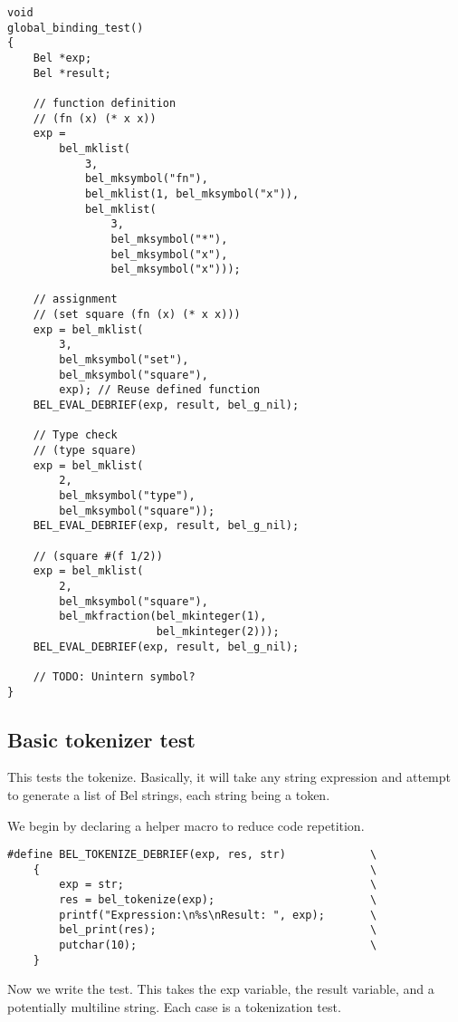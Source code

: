 \documentclass[openright,a4paper,twoside,12pt]{memoir}
\begin{document}
\begin{verbatim}
void
global_binding_test()
{
    Bel *exp;
    Bel *result;

    // function definition
    // (fn (x) (* x x))
    exp =
        bel_mklist(
            3,
            bel_mksymbol("fn"),
            bel_mklist(1, bel_mksymbol("x")),
            bel_mklist(
                3,
                bel_mksymbol("*"),
                bel_mksymbol("x"),
                bel_mksymbol("x")));
    
    // assignment
    // (set square (fn (x) (* x x)))
    exp = bel_mklist(
        3,
        bel_mksymbol("set"),
        bel_mksymbol("square"),
        exp); // Reuse defined function
    BEL_EVAL_DEBRIEF(exp, result, bel_g_nil);

    // Type check
    // (type square)
    exp = bel_mklist(
        2,
        bel_mksymbol("type"),
        bel_mksymbol("square"));
    BEL_EVAL_DEBRIEF(exp, result, bel_g_nil);
    
    // (square #(f 1/2))
    exp = bel_mklist(
        2,
        bel_mksymbol("square"),
        bel_mkfraction(bel_mkinteger(1),
                       bel_mkinteger(2)));
    BEL_EVAL_DEBRIEF(exp, result, bel_g_nil);

    // TODO: Unintern symbol?
}
\end{verbatim}

\subsection{Basic tokenizer test}
\label{sec:org688e315}

This tests the tokenize. Basically, it will take any string expression
and attempt  to generate a  list of Bel  strings, each string  being a
token.

We begin by declaring a helper macro to reduce code repetition.

\begin{verbatim}
#define BEL_TOKENIZE_DEBRIEF(exp, res, str)             \
    {                                                   \
        exp = str;                                      \
        res = bel_tokenize(exp);                        \
        printf("Expression:\n%s\nResult: ", exp);       \
        bel_print(res);                                 \
        putchar(10);                                    \
    }
\end{verbatim}

Now  we write  the  test.  This takes  the  exp  variable, the  result
variable,  and  a  potentially  multiline   string.  Each  case  is  a
tokenization test.
\end{document}

